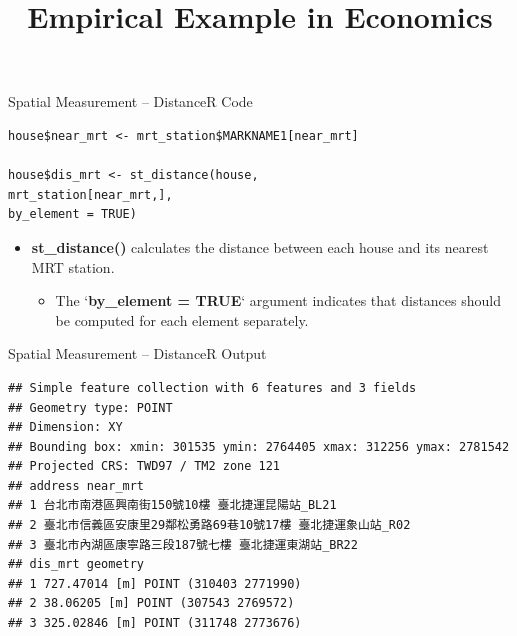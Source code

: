 \documentclass[dvipsnames,hyperref={pdfpagelabels=false}]{beamer}
\begin{document}
\begin{frame}[fragile]{Spatial Measurement -- Distance}{R Code}
\begin{lstlisting}
house$near_mrt <- mrt_station$MARKNAME1[near_mrt]

house$dis_mrt <- st_distance(house,
mrt_station[near_mrt,],
by_element = TRUE)
\end{lstlisting}

\begin{itemize}
		\item \textbf{st\_distance()} calculates the distance between each house and its nearest MRT station.
	\vspace{0.2cm}
	\begin{itemize}
		\item The `\textbf{by\_element = TRUE}` argument indicates that distances should be computed for each element separately.
		\vspace{0.2cm}
		
	\end{itemize}
\end{itemize}
\end{frame}




\begin{frame}[fragile]{Spatial Measurement -- Distance}{R Output}

\tiny

\begin{lstlisting}
## Simple feature collection with 6 features and 3 fields
## Geometry type: POINT
## Dimension: XY
## Bounding box: xmin: 301535 ymin: 2764405 xmax: 312256 ymax: 2781542
## Projected CRS: TWD97 / TM2 zone 121
## address near_mrt
## 1 台北市南港區興南街150號10樓 臺北捷運昆陽站_BL21
## 2 臺北市信義區安康里29鄰松勇路69巷10號17樓 臺北捷運象山站_R02
## 3 臺北市內湖區康寧路三段187號七樓 臺北捷運東湖站_BR22
## dis_mrt geometry
## 1 727.47014 [m] POINT (310403 2771990)
## 2 38.06205 [m] POINT (307543 2769572)
## 3 325.02846 [m] POINT (311748 2773676)
\end{lstlisting}


\end{frame}









\title[]  
{Empirical Example in Economics}


\author 
{}

\institute{}
\end{document}
